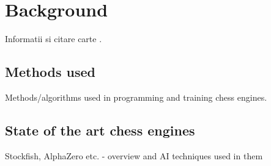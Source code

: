 \chapter{Background}
\label{chap:ch2}

\indent\par Informatii si citare carte \cite{Sommerville2010}.

\section{Methods used}
\label{sec:ch2sec1}

\par Methods/algorithms used in programming and training chess engines.

\section{State of the art chess engines}
\label{sec:ch2sec2}

\par Stockfish, AlphaZero etc. - overview and AI techniques used in them 











 
